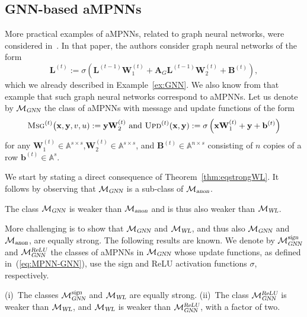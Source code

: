 \subsection{GNN-based aMPNNs}
More practical examples of aMPNNs, related to graph neural networks, were considered in~\cite{grohewl}.
In that paper, the authors consider graph neural networks of the form
$$
\mathbf{L}^{(t)}:=\sigma\left(\mathbf{L}^{(t-1)}\mathbf{W}_1^{(t)}+\mathbf{A}_G\mathbf{L}^{(t-1)}\mathbf{W}_2^{(t)}+\mathbf{B}^{(t)}\right), $$
which we already described in Example~\ref{ex:GNN}. We also know from that example that such graph neural networks correspond to aMPNNs.
Let us denote by $\mathcal{M}_{\textsl{GNN}}$ the class of aMPNNs with message and update functions of the form
\begin{equation}\textsc{Msg}^{(t)}\bigl(\mathbf{x},\mathbf{y},v,u):=\mathbf{y}\mathbf{W}_2^{(t)}
\text{ and } 
\textsc{Upd}^{(t)}(\mathbf{x},\mathbf{y}):=\sigma\left(\mathbf{x}\mathbf{W}_1^{(t)}+\mathbf{y} + \mathbf{b}^{(t)}\right) \label{eq:MPNN-GNN}
\end{equation}
for any $\mathbf{W}_1^{(t)}\in\mathbb{A}^{s\times s}$,$\mathbf{W}_2^{(t)}\in\mathbb{A}^{s\times s}$, and $\mathbf{B}^{(t)}\in\mathbb{A}^{n\times s}$ consisting of $n$ copies of a row $\mathbf{b}^{(t)}\in\mathbb{A}^{s}$. 

We start by stating a direct consequence of Theorem~\ref{thm:eqstrongWL}. It follows by observing
that $\mathcal{M}_{\textsl{GNN}}$ is a sub-class of 
$\mathcal{M}_{\textsl{anon}}$.
\begin{corollary}
	The class 
$\mathcal{M}_{\textsl{GNN}}$ is weaker than $\mathcal{M}_{\textsl{anon}}$ and is thus also weaker than $\mathcal{M}_{\textsl{WL}}$.
\end{corollary}

More challenging is to show that $\mathcal{M}_{\textsl{GNN}}$ and $\mathcal{M}_{\textsl{WL}}$, and thus also $\mathcal{M}_{\textsl{GNN}}$ and $\mathcal{M}_{\textsl{anon}}$, are equally strong. The following results are known. We denote
by $\mathcal{M}_{\textsl{GNN}}^{\textsl{sign}}$
and $\mathcal{M}_{\textsl{GNN}}^{\textsl{ReLU}}$ the classes of  aMPNNs in
$\mathcal{M}_{\textsl{GNN}}$ whose update functions, as defined
in~(\ref{eq:MPNN-GNN}), use the sign and ReLU activation functions $\sigma$, respectively.

\begin{theorem} \label{thm:grohe_lower}
(i)~The classes $\mathcal{M}_{\textsl{GNN}}^{\textsl{sign}}$ and  $\mathcal{M}_{\textsl{WL}}$ are equally strong. (ii)~The class 
$\mathcal{M}_{\textsl{GNN}}^{\textsl{ReLU}}$ is weaker than $\mathcal{M}_{\textsl{WL}}$, and
$\mathcal{M}_{\textsl{WL}}$ is weaker than $\mathcal{M}_{\textsl{GNN}}^{\textsl{ReLU}}$, with a factor of two.
\end{theorem}


